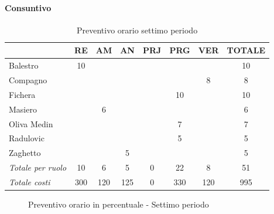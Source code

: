 \documentclass[a4paper,12pt]{article}
\begin{document}
            \paragraph{Consuntivo}
                \begin{table}[H]
                \centering
                \caption{Preventivo orario settimo periodo}
                \begin{tabular}{|l|c|c|c|c|c|c|c|}
                \hline
                    \rowcolor{lightgray}{\textbf{Membro}} & {\textbf{RE}} & {\textbf{AM}} & {\textbf{AN}} & {\textbf{PRJ}} & {\textbf{PRG}} & {\textbf{VER}} & {\textbf{TOTALE}}\\
                \hline
                    Balestro & 10 & & & & & & 10\\
                \hline
                    Compagno & & & & & & 8 & 8\\
                \hline
                    Fichera & & & & & 10 & & 10\\
                \hline
                    Masiero & & 6 & & & & & 6\\
                \hline
                    Oliva Medin & & & & & 7 & & 7\\
                \hline
                    Radulovic & & & & & 5 & & 5\\
                \hline
                    Zaghetto & & & 5 & & & & 5\\
                \hline
                    \rowcolor{lightgray}\textit{Totale per ruolo} & 10 & 6 & 5 & 0 & 22 & 8 & 51\\
                \hline
                    \rowcolor{lightgray}\textit{Totale costi} & 300 & 120 & 125 & 0 & 330 & 120 & 995\\
                \hline
                \end{tabular}
                \end{table}

                \begin{figure}[H]
                \centering
                \caption{Preventivo orario in percentuale - Settimo periodo}
                \end{figure}
                
\end{document}
